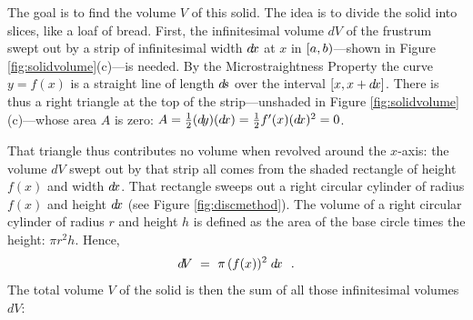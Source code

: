The goal is to find the volume $V$ of this solid. The idea is to divide the
solid into slices, like a loaf of bread. First, the
infinitesimal volume $d\!V$ of the frustrum swept out by a strip of
infinitesimal width $d\!x$ at $x$ in $\lbrack a,b )$---shown in Figure
\ref{fig:solidvolume}(c)---is needed. By the Microstraightness Property the
curve $y=f(x)$ is a straight line of length $d\!s$ over the interval
$\lbrack x,x+d\!x \rbrack$. There is thus a right triangle at the top of the
strip---unshaded in Figure \ref{fig:solidvolume}(c)---whose area $A$ is zero:
$A = \tfrac{1}{2} (d\!y)(d\!x) = \tfrac{1}{2} f'(x) (d\!x)^2 = 0$.

\piccaption[]{\label{fig:discmethod}}
That triangle thus contributes no volume when revolved around the
$x$-axis: the volume $d\!V$ swept out by that strip all comes from the shaded
rectangle of height $f(x)$ and width $d\!x$. That rectangle sweeps out a right
circular cylinder of radius $f(x)$ and height $d\!x$ (see Figure
\ref{fig:discmethod}). The volume of a right circular cylinder of radius $r$ and
height $h$ is defined as the area of the base circle times the height:
$\pi r^2h$. Hence,
\[
d\!V ~=~ \pi\,(f(x))^2\;d\!x ~~.
\]
The total volume $V$ of the solid is then the sum of all those infinitesimal
volumes $d\!V$:

